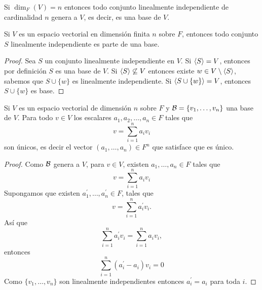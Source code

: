 \documentclass[12pt,a4paper]{book}
\begin{document}
    \begin{lema}
    \label{lema:5}
        Si $\dim_{F}(V)=n$ entonces todo conjunto linealmente independiente de cardinalidad $n$
        genera a $V$, es decir, es una base de $V$.
    \end{lema}

    \begin{proposicion}
    \label{prop:19}
        Si $V$ es un espacio vectorial en dimensión finita $n$ sobre $F$, entonces todo conjunto
        $S$ linealmente independiente es parte de una base.
    \end{proposicion}

    \begin{proof}
        Sea $S$ un conjunto linealmente independiente en $V$. Si $\langle S \rangle=V$, entonces por definición
        $S$ es una base de $V$. Si $\langle S \rangle\not\subseteq V$ entonces existe $w\in V\setminus\langle S \rangle$,
        sabemos que $S\cup\{w\}$ es linealmente independiente. Si $\langle S\cup\{w\} \rangle=V$, entonces
        $S\cup\{w\}$ es base. 
    \end{proof}

    \begin{proposicion}
    \label{prop:20}
        Si $V$ es un espacio vectorial de dimensión $n$ sobre $F$ y $\mathcal{B}=\{v_{1},\dots,v_{n}\}$
        una base de $V$. Para todo $v\in V$ los escalares $a_{1},a_{2},\dots,a_{n}\in F$ tales que
        \begin{equation*}
            v=\sum_{i=1}^{n}a_{i}v_{i}
        \end{equation*}
        son únicos, es decir el vector $(a_{1},\dots,a_{n})\in F^{n}$ que satisface que es único.
    \end{proposicion}

    \begin{proof}
        Como $\mathcal{B}$ genera a $V$, para $v\in V$, existen $a_{1},\dots,a_{n}\in F$ tales que
        \begin{equation*}
            v=\sum_{i=1}^{n}a_{i}v_{i}
        \end{equation*}
        Supongamos que existen $a_{1}^{\prime},\dots,a_{n}^{\prime}\in F$, tales que
        \begin{equation*}
            v=\sum_{i=1}^{n}a_{i}^{\prime}v_{i}.
        \end{equation*}
        Así que
        \begin{equation*}
            \sum_{i=1}^{n}a_{i}^{\prime}v_{i}=\sum_{i=1}^{n}a_{i}v_{i},
        \end{equation*}
        entonces
        \begin{equation*}
            \sum_{i=1}^{n}(a_{i}^{\prime}-a_{i})v_{i}=0
        \end{equation*}
        Como $\{v_{1},\dots,v_{n}\}$ son linealmente independientes entonces $a_{i}^{\prime}=a_{i}$
        para toda $i$.
    \end{proof}
\end{document}

